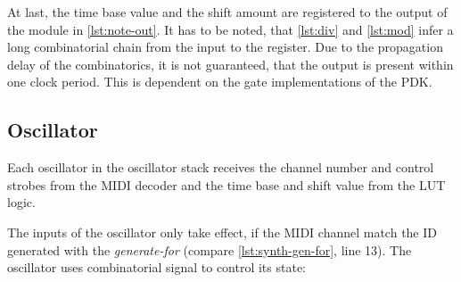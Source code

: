 



At last, the time base value and the shift amount are registered to the output of the module in \autoref{lst:note-out}. It has to be noted, that \autoref{lst:div} and \autoref{lst:mod} infer a long combinatorial chain from the input to the register. Due to the propagation delay of the combinatorics, it is not guaranteed, that the output is present within one clock period. This is dependent on the gate implementations of the PDK.



\subsection{Oscillator}

Each oscillator in the oscillator stack receives the channel number and control strobes from the \acs{MIDI} decoder and the time base and shift value from the \acs{LUT} logic.



The inputs of the oscillator only take effect, if the MIDI channel match the ID generated with the \emph{generate-for} (compare \autoref{lst:synth-gen-for}, line 13). The oscillator uses combinatorial signal to control its state:

